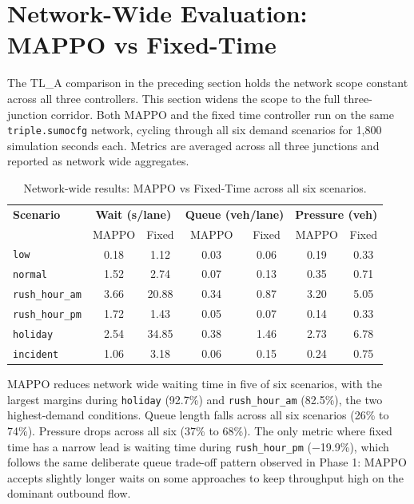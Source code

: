 ﻿\documentclass[11pt, a4paper]{report}
\begin{document}
\section{Network-Wide Evaluation: MAPPO vs Fixed-Time}

The TL\_A comparison in the preceding section holds the network scope constant across all three controllers. This section widens the scope to the full three-junction corridor. Both MAPPO and the fixed time controller run on the same \texttt{triple.sumocfg} network, cycling through all six demand scenarios for 1,800 simulation seconds each. Metrics are averaged across all three junctions and reported as network wide aggregates.

\begin{table}[H]
\centering
\caption{Network-wide results: MAPPO vs Fixed-Time across all six scenarios.}
\label{tab:network_wide}
\begin{tabular}{lcccccc}
\toprule
\textbf{Scenario} & \multicolumn{2}{c}{\textbf{Wait (s/lane)}} & \multicolumn{2}{c}{\textbf{Queue (veh/lane)}} & \multicolumn{2}{c}{\textbf{Pressure (veh)}} \\
 & MAPPO & Fixed & MAPPO & Fixed & MAPPO & Fixed \\
\midrule
\texttt{low}            & 0.18 & 1.12  & 0.03 & 0.06 & 0.19 & 0.33 \\
\texttt{normal}         & 1.52 & 2.74  & 0.07 & 0.13 & 0.35 & 0.71 \\
\texttt{rush\_hour\_am} & 3.66 & 20.88 & 0.34 & 0.87 & 3.20 & 5.05 \\
\texttt{rush\_hour\_pm} & 1.72 & 1.43  & 0.05 & 0.07 & 0.14 & 0.33 \\
\texttt{holiday}        & 2.54 & 34.85 & 0.38 & 1.46 & 2.73 & 6.78 \\
\texttt{incident}       & 1.06 & 3.18  & 0.06 & 0.15 & 0.24 & 0.75 \\
\bottomrule
\end{tabular}
\end{table}

MAPPO reduces network wide waiting time in five of six scenarios, with the largest margins during \texttt{holiday} (92.7\%) and \texttt{rush\_hour\_am} (82.5\%), the two highest-demand conditions. Queue length falls across all six scenarios (26\% to 74\%). Pressure drops across all six (37\% to 68\%). The only metric where fixed time has a narrow lead is waiting time during \texttt{rush\_hour\_pm} ($-$19.9\%), which follows the same deliberate queue trade-off pattern observed in Phase 1: MAPPO accepts slightly longer waits on some approaches to keep throughput high on the dominant outbound flow.
\end{document}
